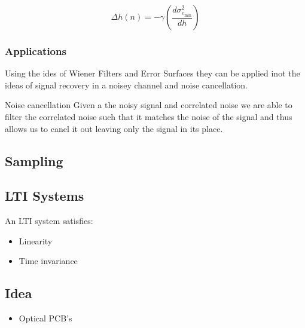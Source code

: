 \begin{equation}
  \Delta h(n) = -\gamma(\frac{d \sigma^2_{e_{\text{min}}}}{dh})
\end{equation}

\subsubsection{Applications} 
Using the ides of Wiener Filters and  Error Surfaces they can be applied inot the ideas of signal recovery in a noisey channel and noise cancellation. 

Noise cancellation
Given a the noisy signal and correlated noise we are able to filter the correlated noise such that it matches the noise of the signal and thus allows us to canel it out leaving only the signal in its place. 

 


\subsection{Sampling}

\subsection{LTI Systems}

An LTI system satisfies:
\begin{itemize}
  \item Linearity
  \item Time invariance
\end{itemize}


\subsection{Idea}
\begin{itemize}
  \item Optical PCB's
\end{itemize}

